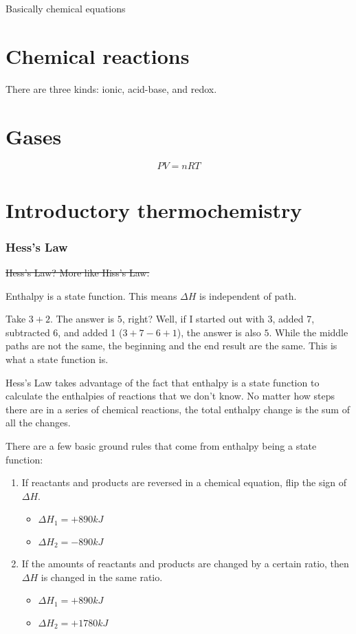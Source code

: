 \documentclass[letterpaper, 12pt]{article}
\begin{document}
Basically chemical equations

\clearpage

\part{Chemical reactions}
There are three kinds: ionic, acid-base, and redox.

\clearpage

\part{Gases}

$$PV = nRT$$

\clearpage

\part{Introductory thermochemistry}

\section{Hess's Law}
\st{Hess's Law? More like Hiss's Law.}

Enthalpy is a state function. This means $\Delta H$ is independent of path.

Take $3 + 2$. The answer is $5$, right? Well, if I started out with 3, added 7, subtracted 6, and added 1 ($3 + 7 - 6 + 1$), the answer is also $5$. While the middle paths are not the same, the beginning and the end result are the same. This is what a state function is.

Hess's Law takes advantage of the fact that enthalpy is a state function to calculate the enthalpies of reactions that we don't know. No matter how steps there are in a series of chemical reactions, the total enthalpy change is the sum of all the changes.

There are a few basic ground rules that come from enthalpy being a state function:
\begin{enumerate}
	\item If reactants and products are reversed in a chemical equation, flip the sign of $\Delta H$.
	\begin{itemize}
		\item {} $\Delta H_{1} = +890 kJ$
		\item {} $\Delta H_{2} = -890 kJ$
	\end{itemize}
	\item If the amounts of reactants and products are changed by a certain ratio, then $\Delta H$ is changed in the same ratio.
	\begin{itemize}
		\item {} $\Delta H_{1} = +890 kJ$
		\item {} $\Delta H_{2} = +1780 kJ$
	\end{itemize}
\end{enumerate}
\end{document}
